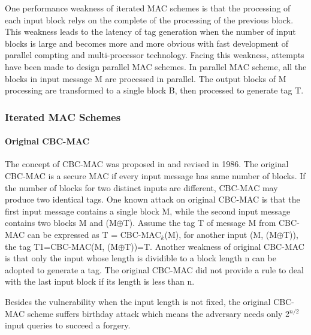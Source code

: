 \documentclass{article}
\begin{document}
One performance weakness of iterated MAC schemes is that the processing of each input block relys on the complete of the processing of the previous block. This weakness leads to the latency of tag generation when the number of input blocks is large and becomes more and more obvious with fast development of parallel compting and multi-processor technology. 
Facing this weakness, attempts have been made to design parallel MAC schemes. 
In parallel MAC scheme, all the blocks in input message M are processed in parallel. The output blocks of M processing are transformed to a single block B, then processed to generate tag T. 

\subsubsection{Iterated MAC Schemes}
\paragraph{Original CBC-MAC}
The concept of CBC-MAC was proposed in \cite{cbc-mac} and revised in 1986. The original CBC-MAC is a secure MAC if every input message has same number of blocks. If the number of blocks for two distinct inputs are different, CBC-MAC may produce two identical tags. One known attack on original CBC-MAC is that the first input message contains a single block M, while the second input message contains two blocks M and (M$\oplus$T). Assume the tag T of message M from CBC-MAC can be expressed as T = CBC-MAC$_k$(M), for another input (M, (M$\oplus$T)), the tag T1=CBC-MAC(M, (M$\oplus$T))=T. 
Another weakness of original CBC-MAC is that only the input whose length is dividible to a block length n can be adopted to generate a tag. The original CBC-MAC did not provide a rule to deal with the last input block if its length is less than n.   

Besides the vulnerability when the input length is not fixed, the original CBC-MAC scheme suffers birthday attack which means the adversary needs only 2$^{n/2}$ input queries to succeed a forgery. 
\end{document}
